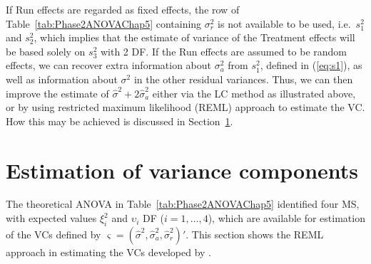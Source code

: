 If Run effects are regarded as fixed effects, the row of Table~\ref{tab:Phase2ANOVAChap5} containing $\sigma_r^2$ is not available to be used, i.e.\ $s_1^2$ and $s_2^2$, which implies that the estimate of variance of the Treatment effects will be based solely on $s_3^2$ with 2 DF. If the Run effects are assumed to be random effects, we can recover extra information about $\sigma_a^2$ from $s_1^2$, defined in (\ref{eq:s1}), as well as information about $\sigma^2$ in the other residual variances. Thus, we can then improve the estimate of $\hat{\sigma}^2+2\hat{\sigma}_{a}^2$ either via the LC method as illustrated above, or by using restricted maximum likelihood (REML) approach to estimate the VC. How this may be achieved is discussed in Section~\ref{sec:estVC}.

\section{Estimation of variance components}
\label{sec:estVC}
The theoretical ANOVA in Table~\ref{tab:Phase2ANOVAChap5} identified four MS, with expected values $\xi_i^2$ and $\upsilon_i$ DF ($i = 1,\dots,4$), which are available for estimation of the VCs defined by $\bm{\varsigma} = (\hat{\sigma}^2, \hat{\sigma}_a^2, \hat{\sigma}_r^2)'$. This section shows the REML approach in estimating the VCs developed by \cite{Jarrett2008}. 


